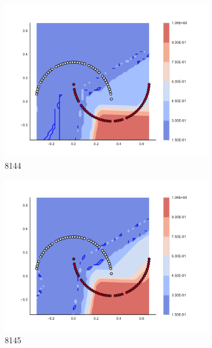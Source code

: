 \begin{figure}[h]
\begin{subfigure}[b]{0.09\textwidth}
    \includegraphics[clip, trim=2.35cm 1.75cm 4.5cm 0cm,width=\textwidth]{img/convergence/8144.pdf}
    \caption{8144}
    \label{fig:convergence_8144}
\end{subfigure}
%
\begin{subfigure}[b]{0.09\textwidth}
    \includegraphics[clip, trim=2.35cm 1.75cm 4.5cm 0cm,width=\textwidth]{img/convergence/8145.pdf}
    \caption{8145}
    \label{fig:convergence_8145}
\end{subfigure}
%
\begin{subfigure}[b]{0.09\textwidth}

\end{subfigure}
\end{figure}
